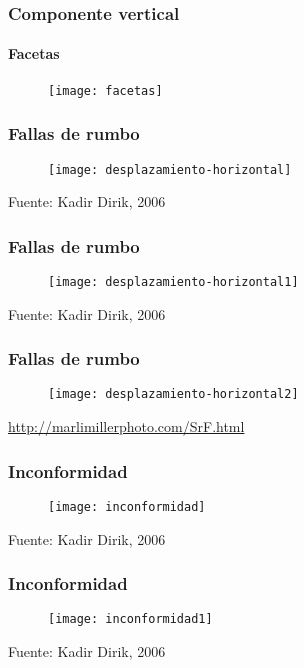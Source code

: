 \documentclass[14pt]{beamer}
\begin{document}
  \begin{frame}
\frametitle{Componente vertical}
\framesubtitle{Facetas}
 \begin{figure}
    \centering
    \texttt{[image: facetas]}
  \end{figure}
\end{frame}
  \begin{frame}
\frametitle{Fallas de rumbo}
 \begin{figure}
    \centering
    \texttt{[image: desplazamiento-horizontal]}
  \end{figure}
  \tiny{Fuente: Kadir Dirik, 2006}
\end{frame}
  \begin{frame}
\frametitle{Fallas de rumbo}
 \begin{figure}
    \centering
    \texttt{[image: desplazamiento-horizontal1]}
  \end{figure}
  \tiny{Fuente: Kadir Dirik, 2006}
\end{frame}
  \begin{frame}
\frametitle{Fallas de rumbo}
 \begin{figure}
    \centering
    \texttt{[image: desplazamiento-horizontal2]}
  \end{figure}
  \tiny{\url{http://marlimillerphoto.com/SrF.html}}
\end{frame}
  \begin{frame}
\frametitle{Inconformidad}
 \begin{figure}
    \centering
    \texttt{[image: inconformidad]}
  \end{figure}
  \tiny{Fuente: Kadir Dirik, 2006}
\end{frame}
  \begin{frame}
\frametitle{Inconformidad}
 \begin{figure}
    \centering
    \texttt{[image: inconformidad1]}
  \end{figure}
  \tiny{Fuente: Kadir Dirik, 2006}
\end{frame}
\end{document}
